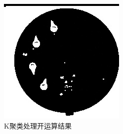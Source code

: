 \documentclass[a4paper]{ctexart}
\begin{document}
\begin{enumerate}[label=\arabic*、]
\begin{enumerate}[label=\alph*)]
\begin{figure}[htbp]
\begin{minipage}[t]{0.25\textwidth}
				\includegraphics[width=\textwidth]{figure/open_2/img5.jpg}
			\end{minipage}
			\caption{K聚类处理开运算结果}\label{fig:K聚类开运算}
		\end{figure}
	\end{enumerate}
	

\end{enumerate}
\end{document}
